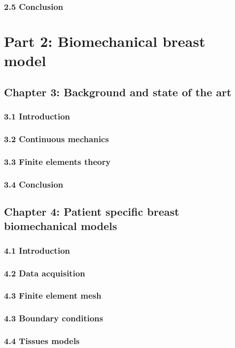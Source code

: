 \subsubsection*{2.5 Conclusion }
\newpage
\section*{Part 2: Biomechanical breast model}
\subsection*{Chapter 3: Background and state of the art }
\subsubsection*{3.1 Introduction }
\subsubsection*{3.2 Continuous mechanics}
\subsubsection*{3.3 Finite elements theory} 
\subsubsection*{3.4 Conclusion }
\subsection*{Chapter 4: Patient specific breast biomechanical models}
\subsubsection*{4.1 Introduction }
\subsubsection*{4.2 Data acquisition} 
\subsubsection*{4.3 Finite element mesh} 
\subsubsection*{4.3 Boundary conditions} 
\subsubsection*{4.4 Tissues models} 
